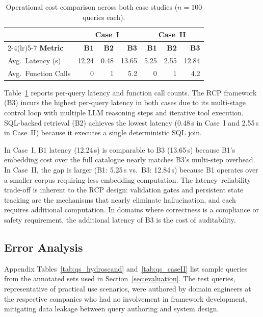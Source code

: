 \documentclass[largeformat]{interact}
\begin{document}
\begin{table}[h]
    \centering
    \caption{Operational cost comparison across both case studies ($n = 100$ queries each).}
    \label{tab:operational_cost_combined}
    \small
    \setlength{\tabcolsep}{5pt}
    \renewcommand{\arraystretch}{1.1}
    \begin{tabular}{@{}lrrrrrr@{}}
        \toprule
        & \multicolumn{3}{c}{\textbf{Case~I}} & \multicolumn{3}{c}{\textbf{Case~II}} \\
        \cmidrule(lr){2-4}\cmidrule(lr){5-7}
        \textbf{Metric} & \textbf{B1} & \textbf{B2} & \textbf{B3} & \textbf{B1} & \textbf{B2} & \textbf{B3} \\
        \midrule
        Avg.\ Latency (s)    & 12.24 & 0.48  & 13.65 & 5.25  & 2.55  & 12.84 \\
        Avg.\ Function Calls & 0     & 1     & 5.2   & 0     & 1     & 4.2   \\
        \bottomrule
    \end{tabular}
\end{table}

Table~\ref{tab:operational_cost_combined} reports per-query latency and function call counts. The RCP framework (B3) incurs the highest per-query latency in both cases due to its multi-stage control loop with multiple LLM reasoning steps and iterative tool execution. SQL-backed retrieval (B2) achieves the lowest latency (0.48\,s in Case~I and 2.55\,s in Case~II) because it executes a single deterministic SQL join.

In Case~I, B1 latency (12.24\,s) is comparable to B3 (13.65\,s) because B1's embedding cost over the full catalogue nearly matches B3's multi-step overhead. In Case~II, the gap is larger (B1: 5.25\,s vs.\ B3: 12.84\,s) because B1 operates over a smaller corpus requiring less embedding computation. The latency--reliability trade-off is inherent to the RCP design: validation gates and persistent state tracking are the mechanisms that nearly eliminate hallucination, and each requires additional computation. In domains where correctness is a compliance or safety requirement, the additional latency of B3 is the cost of auditability.
 
\subsection{Error Analysis}
\label{subsec:error_analysis}
Appendix Tables~\ref{tab:qs_hydroscand} and~\ref{tab:qs_caseII} list sample queries from the annotated sets used in Section~\ref{sec:evaluation}. The test queries, representative of practical use scenarios, were authored by domain engineers at the respective companies who had no involvement in framework development, mitigating data leakage between query authoring and system design.
\end{document}
